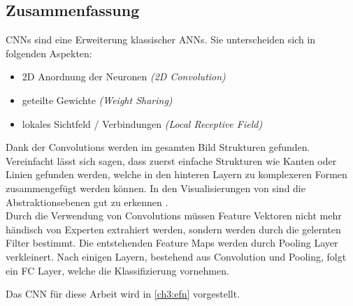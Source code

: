 \subsection*{Zusammenfassung}
\acp{CNN} sind eine Erweiterung klassischer \acp{ANN}.
Sie unterscheiden sich in folgenden Aspekten:
\begin{itemize}
    \item 2D Anordnung der Neuronen \textit{(2D Convolution)} 
    \item geteilte Gewichte \textit{(Weight Sharing)}
    \item lokales Sichtfeld / Verbindungen \textit{(Local Receptive Field)}
\end{itemize}

Dank der Convolutions werden im gesamten Bild Strukturen gefunden.
Vereinfacht lässt sich sagen, dass  zuerst einfache Strukturen wie Kanten oder Linien gefunden werden, welche in den hinteren Layern zu komplexeren Formen zusammengefügt werden können.
In den Visualisierungen von \citeauthor{zeiler_visualizing_2013} sind die Abstraktionsebenen gut zu erkennen \cite{zeiler_visualizing_2013}. \\

Durch die Verwendung von Convolutions müssen Feature Vektoren nicht mehr händisch von Experten extrahiert werden, sondern werden durch die gelernten Filter bestimmt.
Die entstehenden Feature Maps werden durch Pooling Layer verkleinert.
Nach einigen Layern, bestehend aus Convolution und Pooling, folgt ein \ac{FC} Layer, welche die Klassifizierung vornehmen.

Das \ac{CNN} für diese Arbeit wird in \autoref{ch3:efn} vorgestellt.
